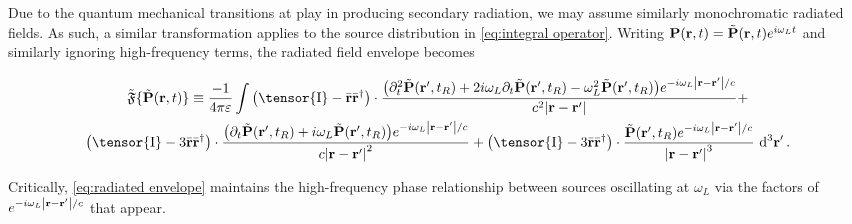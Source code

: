 Due to the quantum mechanical transitions at play in producing secondary radiation, we may assume similarly monochromatic radiated fields.
As such, a similar transformation applies to the source distribution in \cref{eq:integral operator}.
Writing $\vb{P}(\vb{r}, t) = \tilde{\vb{P}}(\vb{r}, t)e^{i \omega_L t}$ and similarly ignoring high-frequency terms, the radiated field envelope becomes
\begin{widetext}
\begin{equation}
  \begin{gathered}
    \tilde{\mathfrak{F}}\{ \tilde{\vb{P}}(\vb{r}, t) \} \equiv \frac{-1}{4\pi \varepsilon} \int
    \qty(\tensor{\mathrm{I}} -  \bar{\vb{r}}\bar{\vb{r}}^\dagger) \cdot \frac{\qty(\partial_t^2 \tilde{\vb{P}}(\vb{r}', t_R) + 2 i \omega_L \partial_t \tilde{\vb{P}}(\vb{r}', t_R) - \omega_L^2 \tilde{\vb{P}}(\vb{r}', t_R)) e^{-i \omega_L \abs{\vb{r} - \vb{r}'}/c}}{c^2 \abs{\vb{r}-\vb{r}'}} + \\
    \qty(\tensor{\mathrm{I}} - 3\bar{\vb{r}}\bar{\vb{r}}^\dagger) \cdot \frac{\qty(\partial_t \tilde{\vb{P}}(\vb{r}', t_R) + i \omega_L \tilde{\vb{P}}(\vb{r}', t_R))e^{-i \omega_L \abs{\vb{r} - \vb{r}'}/c}}{c \abs{\vb{r}-\vb{r}'}^2} +
    \qty(\tensor{\mathrm{I}} - 3\bar{\vb{r}}\bar{\vb{r}}^\dagger) \cdot \frac{                \tilde{\vb{P}}(\vb{r}', t_R) e^{-i \omega_L \abs{\vb{r} - \vb{r}'}/c}}{\abs{\vb{r}-\vb{r}'}^3}
    \, \dd[3]{\vb{r'}}.
  \end{gathered}
  \label{eq:radiated envelope}
\end{equation}
\end{widetext}
Critically, \cref{eq:radiated envelope} maintains the high-frequency phase relationship between sources oscillating at $\omega_L$ via the factors of $e^{-i \omega_L \abs{\vb{r} - \vb{r}'}/c}$ that appear.
